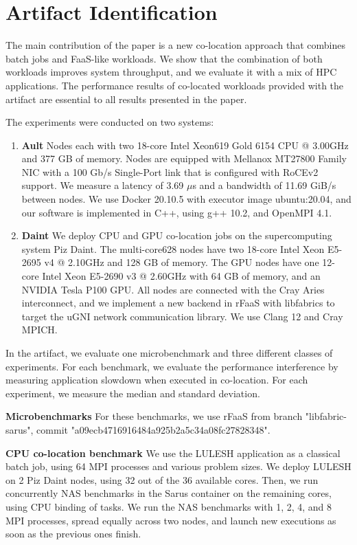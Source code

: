 \documentclass{article}
\begin{document}
\section{Artifact Identification}

The main contribution of the paper is a new co-location approach that combines batch jobs
and FaaS-like workloads.
We show that the combination of both workloads improves system throughput, and we evaluate it with
a mix of HPC applications.
The performance results of co-located workloads provided with the artifact are essential to
all results presented in the paper.

The experiments were conducted on two systems:
\begin{enumerate}
  \item \textbf{Ault} Nodes each with two 18-core Intel Xeon619 Gold 6154 CPU @ 3.00GHz and 377 GB of memory. Nodes are equipped with Mellanox MT27800 Family NIC with a 100 Gb/s Single-Port link that is configured with RoCEv2 support. We measure a latency of 3.69 $\mu$s and a bandwidth of 11.69 GiB/s between nodes. We use Docker 20.10.5 with executor image ubuntu:20.04, and our software is implemented in C++, using g++ 10.2, and OpenMPI 4.1.
  \item \textbf{Daint} We deploy CPU and GPU co-location jobs on the supercomputing system Piz Daint. The multi-core628 nodes have two 18-core Intel Xeon E5-2695 v4 @ 2.10GHz and 128 GB of memory. The GPU nodes have one 12-core Intel Xeon E5-2690 v3 @ 2.60GHz with 64 GB of memory, and an NVIDIA Tesla P100 GPU. All nodes are connected with the Cray Aries interconnect, and we implement a new backend in rFaaS with libfabrics to target the uGNI network communication library. We use Clang 12 and Cray MPICH.
\end{enumerate}

In the artifact, we evaluate one microbenchmark and three different classes of experiments.
For each benchmark, we evaluate the performance interference by measuring application slowdown when executed in co-location. For each experiment, we measure the median and standard deviation.

\textbf{Microbenchmarks} For these benchmarks, we use rFaaS from branch "libfabric-sarus", commit "a09ecb4716916484a925b2a5c34a08fc27828348".

\textbf{CPU co-location benchmark} We use the LULESH application as a classical batch job, using 64 MPI processes and various problem sizes. We deploy LULESH on 2 Piz Daint nodes, using 32 out of the 36 available cores. Then,  we run concurrently NAS benchmarks in the Sarus container on the remaining cores, using CPU binding of tasks. We run the NAS benchmarks with 1, 2, 4, and 8 MPI processes, spread equally across two nodes, and launch new executions as soon as the previous ones finish.
\end{document}
